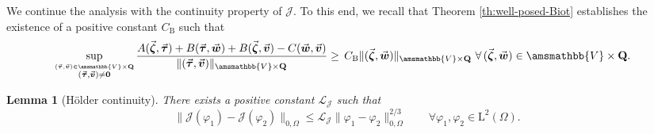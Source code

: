 \documentclass[fleqn,a4paper]{cas-sc}
\newcommand{\bv}{\boldsymbol{v}}
\newcommand{\bw}{\boldsymbol{w}}
\newcommand{\bzeta}{\boldsymbol{\zeta}}
\newcommand{\0}{\boldsymbol{0}}
\newcommand\bQ{\mathbf{Q}}
\newcommand\bbV{\amsmathbb{V}}
\newcommand\rL{\mathrm{L}}
\newcommand\btau{\boldsymbol{\tau}}
\numberwithin{equation}{section}
\numberwithin{figure}{section}
\newtheorem{lemma}[theorem]{Lemma}
\begin{document}
We continue the analysis with the continuity property of ${\mathcal{J}}$. To this end, we recall that Theorem \ref{th:well-posed-Biot} establishes the existence of a positive constant $C_{\mathrm{B}}$ such that 
\begin{align}\label{global-inf-sup-Jhat}
&\sup_{\stackrel{(\vec{\btau},\vec{\bv}) \in \bbV\times \bQ}{ (\vec{\btau},\vec{\bv}) \neq \mathbf{0}}}\frac{A(\vec{\bzeta},\vec{\btau})+B(\vec{\btau},\vec{\bw})+ B(\vec{\bzeta},\vec{\bv})-C(\vec{\bw},\vec{\bv})}{\|(\vec{\btau},\vec{\bv})\|_{\bbV\times \bQ}}\geq \,C_{\mathrm{B}}\|(\vec{\bzeta},\vec{\bw})\|_{\bbV\times \bQ} \ \forall\, (\vec{\bzeta},\vec{\bw})\in \bbV\times \bQ.
\end{align}
\begin{lemma}[Hölder continuity]\label{lemma:continuity-J} 
 There exists a positive constant $\mathcal{L}_{\mathcal{J}}$ such that 
 \begin{equation}\label{continuity-J}
  \|\mathcal{J}(\varphi_{1})-\mathcal{J}(\varphi_{2})\|_{0,\Omega} \leq \mathcal{L}_{\mathcal{J}}\|\varphi_{1}-\varphi_{2}\|_{0, \Omega}^{2/3} \qquad \forall \varphi_1,\varphi_2 \in \rL^2(\Omega).
 \end{equation} 
 \end{lemma}
\end{document}
